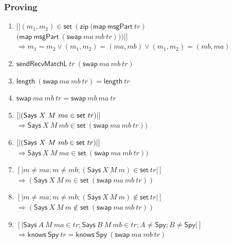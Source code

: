 \documentclass{beamer}
\begin{document}
\begin{frame}\frametitle{Proving}
\begin{enumerate}
\item \label{lemma:swapTrMsgCorrespond}
$[|(m_{1},m_{2})\in \mathsf{set}\ (\mathsf{zip\ (map\ msgPart}\ tr)$ \\
$\mathsf{(map\ msgPart}\ (\mathsf{swap}\ ma\ mb\ tr)))|]$
$\Longrightarrow m_{1}=m_{2}\vee (m_{1},m_{2})=(ma,mb)\vee
(m_{1},m_{2})=(mb,ma)$

\item \label{lemma:swapTrCorrespond2}
$\mathsf{sendRecvMatchL}\ tr\ (\mathsf{swap}\ ma\ mb\ tr)$

\item \label{lemma:swapTrLength}
$\mathsf{length\ }(\mathsf{swap\ }ma\ mb\ tr)=\mathsf{length\ }tr$

\item \label{lemma:swapABIsSwapBA}
$\mathsf{swap}\ ma\ mb\ tr=\mathsf{swap}\ mb\ ma\ tr$

\item \label{lemma:swapTrSwapMaMb}
$[|(\mathsf{Says}\ X\ M\ ma\in {\sf set}\ tr)|]$\\
$\Longrightarrow \mathsf{Says}\ X\ M\ mb\in \mathsf{set}\
(\mathsf{swap}\ ma\ mb\ tr))$

\item \label{lemma:correspondence 1--mb in tr}
$[|(\mathsf{Says}\ X\ M\ mb\in {\sf set}\ tr)|]$\\
$\Longrightarrow \mathsf{Says}\ X\ M\ ma\in \mathsf{set}\
(\mathsf{swap}\ ma\ mb\ tr))$

\item \label{lemma:correspondence 1--not ma and mb in tr}
$[| m\neq ma;m\neq mb;(\mathsf{Says}\ X\ M\ m)\in \mathsf{set}\ tr|]$\\
$\Longrightarrow (\mathsf{Says}\ X\ M\ m\in \mathsf{set}\
(\mathsf{swap}\ ma\ mb\ tr))$

\item \label{lemma:correspondence 2--not ma and mb in tr}
$[| m\neq ma;m\neq mb;(\mathsf{Says}\ X\ M\ m)\notin \mathsf{set}\ tr|]$\\
$\Longrightarrow (\mathsf{Says}\ X\ M\ m\notin \mathsf{set}\
(\mathsf{swap}\ ma\ mb\ tr))$

\item \label{lemma:knowledeEqual}
$[|\mathsf{Says}\ A\ M\ ma\in tr;
 \mathsf{Says}\ B\ M\ mb\in tr; A \neq \mathsf{Spy}; B \neq \mathsf{Spy} |]$\\
$\Longrightarrow \mathsf{knows}\ \mathsf{Spy}\ tr=\mathsf{knows}\
\mathsf{Spy}\ (\mathsf{swap}\ ma\ mb\ tr)$
\end{enumerate}
 \end{frame}
\end{document}
